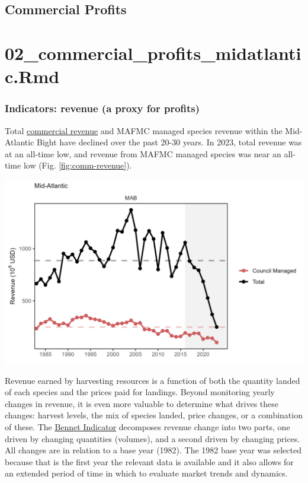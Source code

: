 \documentclass[
  10pt,
]{article}
\let\origfigure\figure
\let\endorigfigure\endfigure
\renewenvironment{figure}[1][2] {
    \expandafter\origfigure\expandafter[H]
} {
    \endorigfigure
}
\begin{document}
\subsection{Commercial Profits}\label{commercial-profits}

\section{02\_commercial\_profits\_midatlantic.Rmd}\label{commercial_profits_midatlantic.rmd}

\subsubsection{Indicators: revenue (a proxy for profits)}\label{indicators-revenue-a-proxy-for-profits}

Total \href{https://noaa-edab.github.io/catalog/comdat.html}{commercial revenue} and MAFMC managed species revenue within the Mid-Atlantic Bight have declined over the past 20-30 years. In 2023, total revenue was at an all-time low, and revenue from MAFMC managed species was near an all-time low (Fig. \ref{fig:comm-revenue}).

\begin{figure}

{\centering \includegraphics[width=6.5in]{images/MidAtlantic/comm_revenue_MidAtlantic_2025-09-05} 

}

\caption{Revenue for the for the Mid-Atlantic region: total (black) and from MAFMC managed species (red).}\label{fig:comm-revenue}
\end{figure}

Revenue earned by harvesting resources is a function of both the quantity landed of each species and the prices paid for landings. Beyond monitoring yearly changes in revenue, it is even more valuable to determine what drives these changes: harvest levels, the mix of species landed, price changes, or a combination of these. The \href{https://noaa-edab.github.io/catalog/bennet.html}{Bennet Indicator} decomposes revenue change into two parts, one driven by changing quantities (volumes), and a second driven by changing prices. All changes are in relation to a base year (1982). The 1982 base year was selected because that is the first year the relevant data is available and it also allows for an extended period of time in which to evaluate market trends and dynamics.
\end{document}

